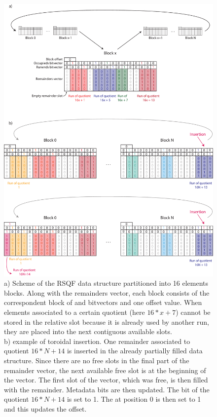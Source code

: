 \begin{figure}[h!]
	\centering
	\includegraphics[width=\linewidth]{figures/kmer_methods/cqf_toricity_export.pdf}
	\caption[The RSQF data structure scheme and toroidal property]{a) Scheme of the RSQF data structure partitioned into 16 elements blocks. Along with the remainders vector, each block consists of the correspondent block of \occs and \rends bitvectors and one offset value. When elements associated to a certain quotient (here $16*x + 7$) cannot be stored in the relative slot because it is already used by another run, they are placed into the next contiguous available slots.\\
	b) example of toroidal insertion. One remainder associated to quotient $16*N + 14$ is inserted in the already partially filled data structure. Since there are no free slots in the final part of the remainder vector, the next available free slot is at the beginning of the vector. The first slot of the vector, which was free, is then filled with the remainder. Metadata bits are then updated. The \occ bit of the quotient $16*N + 14$ is set to 1. The \rend at position 0 is then set to 1 and this updates the offset.} 
	\label{fig:cqf_toricity}
\end{figure}

